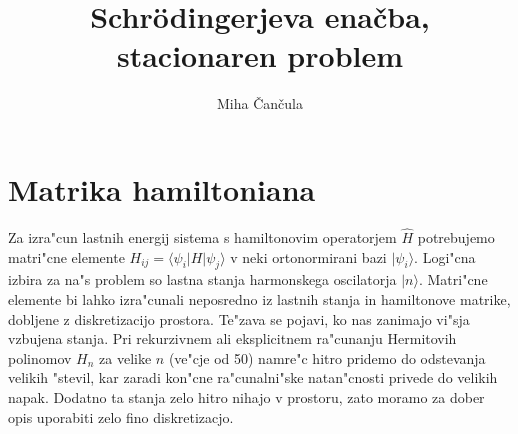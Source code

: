 \documentclass[a4paper,10pt]{article}
\title{Schr\"odingerjeva ena\v cba, stacionaren problem}
\author{Miha \v Can\v cula}
\begin{document}
\maketitle

\section{Matrika hamiltoniana}

Za izra"cun lastnih energij sistema s hamiltonovim operatorjem $\hat H$ potrebujemo matri"cne elemente $H_{ij} = \langle\psi_i|H|\psi_j\rangle$ v neki ortonormirani bazi $|\psi_i\rangle$. Logi"cna izbira za na"s problem so lastna stanja harmonskega oscilatorja $|n\rangle$. Matri"cne elemente bi lahko izra"cunali neposredno iz lastnih stanja in hamiltonove matrike, dobljene z diskretizacijo prostora. Te"zava se pojavi, ko nas zanimajo vi"sja vzbujena stanja. Pri rekurzivnem ali eksplicitnem ra"cunanju Hermitovih polinomov $H_n$ za velike $n$ (ve"cje od 50) namre"c hitro pridemo do odstevanja velikih "stevil, kar zaradi kon"cne ra"cunalni"ske natan"cnosti privede do velikih napak. Dodatno ta stanja zelo hitro nihajo v prostoru, zato moramo za dober opis uporabiti zelo fino diskretizacjo. 
\end{document}
